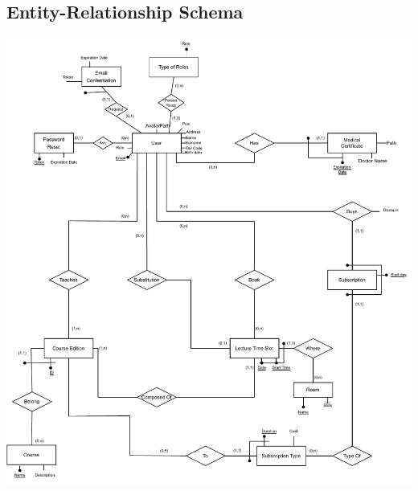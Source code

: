\subsection{Entity-Relationship Schema}

    \begin{center}
        \includegraphics[width=\textwidth,height=\columnwidth]{resources/ER_restructured_v2.pdf}
    \end{center}

